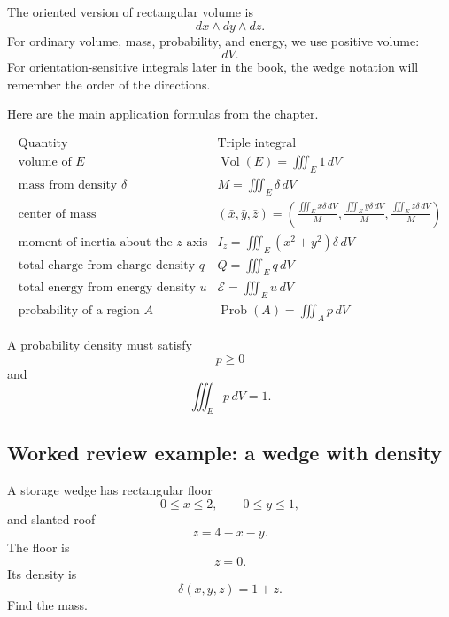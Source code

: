 The oriented version of rectangular volume is
\[
    dx\wedge dy\wedge dz.
\]
For ordinary volume, mass, probability, and energy, we use positive volume:
\[
    dV.
\]
For orientation-sensitive integrals later in the book, the wedge notation will remember
the order of the directions.

Here are the main application formulas from the chapter.

\[
\begin{array}{c|c}
\text{Quantity} & \text{Triple integral} \\ \hline
\text{volume of }E
&
\displaystyle
\operatorname{Vol}(E)=\iiint_E 1\,dV
\\[3mm]
\text{mass from density }\delta
&
\displaystyle
M=\iiint_E \delta\,dV
\\[3mm]
\text{center of mass}
&
\displaystyle
(\bar x,\bar y,\bar z)
=
\left(
\frac{\iiint_E x\delta\,dV}{M},
\frac{\iiint_E y\delta\,dV}{M},
\frac{\iiint_E z\delta\,dV}{M}
\right)
\\[5mm]
\text{moment of inertia about the }z\text{-axis}
&
\displaystyle
I_z=\iiint_E (x^2+y^2)\delta\,dV
\\[4mm]
\text{total charge from charge density }q
&
\displaystyle
Q=\iiint_E q\,dV
\\[3mm]
\text{total energy from energy density }u
&
\displaystyle
\mathcal E=\iiint_E u\,dV
\\[3mm]
\text{probability of a region }A
&
\displaystyle
\operatorname{Prob}(A)=\iiint_A p\,dV
\end{array}
\]

A probability density must satisfy
\[
    p\ge0
\]
and
\[
    \iiint_E p\,dV=1.
\]

\subsection{Worked review example: a wedge with density}

A storage wedge has rectangular floor
\[
    0\le x\le2,\qquad 0\le y\le1,
\]
and slanted roof
\[
    z=4-x-y.
\]
The floor is
\[
    z=0.
\]
Its density is
\[
    \delta(x,y,z)=1+z.
\]
Find the mass.

